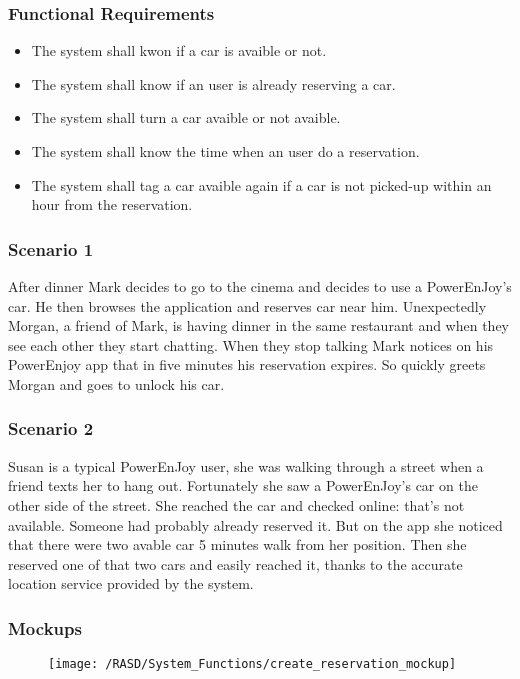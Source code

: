 \subsubsection{Functional Requirements}
\begin{itemize}
  \item The system shall kwon if a car is avaible or not.
  \item The system shall know if an user is already reserving a car.
  \item The system shall turn a car avaible or not avaible.
  \item The system shall know the time when an user do a reservation.
  \item The system shall tag a car avaible again if a car is not picked-up within an hour from the reservation.
\end{itemize}

\subsubsection{Scenario 1}
After dinner Mark decides to go to the cinema and decides to use a PowerEnJoy's car. He then browses the application and reserves car near him.
Unexpectedly Morgan, a friend of Mark, is having dinner in the same restaurant and when they see each other they start chatting. When they stop talking Mark notices on his PowerEnjoy app that in five minutes his reservation expires. So quickly greets Morgan and goes to unlock his car.

\subsubsection{Scenario 2}
Susan is a typical PowerEnJoy user, she was walking through a street when a friend texts her to hang out. Fortunately she saw a PowerEnJoy's car on the other side of the street. She reached the car and checked online: that's not available. Someone had probably already reserved it. But on the app she noticed that there were two avable car 5 minutes walk from her position. Then she reserved one of that two cars and easily reached it, thanks to the accurate location service provided by the system. 


\subsubsection{Mockups}
\begin{figure}[!ht]
  \centering
  \vspace{0.1cm}
  \texttt{[image: /RASD/System\_Functions/create\_reservation\_mockup]}\\
  \vspace{0.4cm}
  \label{fig:create_reservation_mockup} 
\end{figure}


